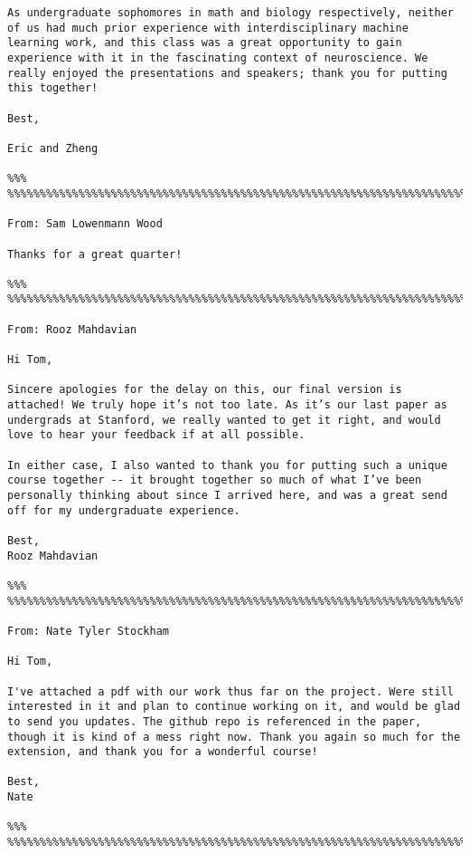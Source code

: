 \documentclass[letterpaper,12pt]{article}
\begin{document}
\begin{verbatim}
As undergraduate sophomores in math and biology respectively, neither of us had much prior experience with interdisciplinary machine learning work, and this class was a great opportunity to gain experience with it in the fascinating context of neuroscience. We really enjoyed the presentations and speakers; thank you for putting this together!

Best,

Eric and Zheng

%%% %%%%%%%%%%%%%%%%%%%%%%%%%%%%%%%%%%%%%%%%%%%%%%%%%%%%%%%%%%%%%%%%%%%%%%%%%%%%

From: Sam Lowenmann Wood

Thanks for a great quarter!

%%% %%%%%%%%%%%%%%%%%%%%%%%%%%%%%%%%%%%%%%%%%%%%%%%%%%%%%%%%%%%%%%%%%%%%%%%%%%%%

From: Rooz Mahdavian

Hi Tom,

Sincere apologies for the delay on this, our final version is attached! We truly hope it’s not too late. As it’s our last paper as undergrads at Stanford, we really wanted to get it right, and would love to hear your feedback if at all possible. 

In either case, I also wanted to thank you for putting such a unique course together -- it brought together so much of what I’ve been personally thinking about since I arrived here, and was a great send off for my undergraduate experience.

Best,
Rooz Mahdavian

%%% %%%%%%%%%%%%%%%%%%%%%%%%%%%%%%%%%%%%%%%%%%%%%%%%%%%%%%%%%%%%%%%%%%%%%%%%%%%%

From: Nate Tyler Stockham

Hi Tom,

I've attached a pdf with our work thus far on the project. Were still interested in it and plan to continue working on it, and would be glad to send you updates. The github repo is referenced in the paper, though it is kind of a mess right now. Thank you again so much for the extension, and thank you for a wonderful course! 

Best,
Nate

%%% %%%%%%%%%%%%%%%%%%%%%%%%%%%%%%%%%%%%%%%%%%%%%%%%%%%%%%%%%%%%%%%%%%%%%%%%%%%%
\end{verbatim}

\end{document}
